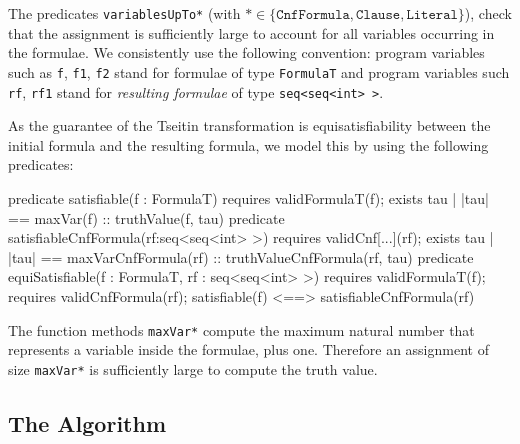 \documentclass[12pt]{report}
\begin{document}
The predicates \texttt{variablesUpTo*} (with
\(\texttt{*} \in \{ \texttt{CnfFormula}, \allowbreak \texttt{Clause},
\texttt{Literal} \} \)), check that the assignment is sufficiently
large to account for all variables occurring in the formulae. We
consistently use the following convention: program variables such as
\texttt{f}, \texttt{f1}, \texttt{f2} stand for formulae of type
\texttt{FormulaT} and program variables such \texttt{rf}, \texttt{rf1}
stand for \emph{resulting formulae} of type \texttt{seq<seq<int> >}.

As the guarantee of the Tseitin transformation is equisatisfiability
between the initial formula and the resulting formula, we model this
by using the following predicates:

\begin{dafny}
predicate satisfiable(f : FormulaT) requires validFormulaT(f);
{ exists tau | |tau| == maxVar(f) :: truthValue(f, tau) }
predicate satisfiableCnfFormula(rf:seq<seq<int> >) requires validCnf[...](rf);
{ exists tau | |tau| == maxVarCnfFormula(rf) :: truthValueCnfFormula(rf, tau) }
predicate equiSatisfiable(f : FormulaT, rf : seq<seq<int> >)
    requires validFormulaT(f); requires validCnfFormula(rf);
{ satisfiable(f) <==> satisfiableCnfFormula(rf) }
\end{dafny}

The function methods \texttt{maxVar*} compute the maximum natural
number that represents a variable inside the formulae, plus
one. Therefore an assignment of size \texttt{maxVar*} is sufficiently
large to compute the truth value.%


\subsection{The Algorithm}
\end{document}
